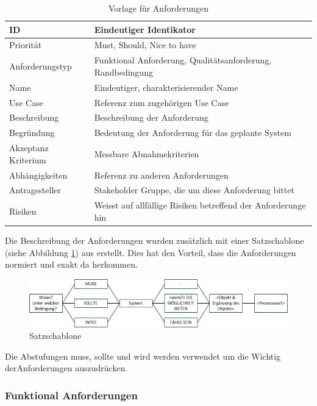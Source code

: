 \begin{table}[ht]
\centering
  \begin{tabular}{ l | p{8cm} }
	\hline
	\rowcolor{gray}
	ID 			&	Eindeutiger Identikator\\ \hline
	Priorität 		&	Must, Should, Nice to have\\ \hline
	Anforderungstyp	&	Funktional Anforderung, Qualitätsanforderung, Randbedingung\\ \hline
	Name 			&	Eindeutiger, charakterisierender Name\\ \hline
	Use Case 		&	Referenz zum zugehörigen Use Case\\ \hline
	Beschreibung 	&	Beschreibung der Anforderung\\ \hline
	Begründung 		&	Bedeutung der Anforderung für das geplante System\\ \hline
	Akzeptanz Kriterium	&	Messbare Abnahmekriterien\\ \hline
	Abhängigkeiten 	&	Referenz zu anderen Anforderungen\\ \hline
	Antragssteller 	&	Stakeholder Gruppe, die um diese Anforderung bittet\\ \hline
	Risiken	 	&	Weisst auf allfällige Risiken betreffend der Anforderunge hin
  \end{tabular}
   \caption{Vorlage für Anforderungen}\label{table:req_template}
\end{table}


Die Beschreibung der Anforderungen wurden zusätzlich mit einer Satzschablone (siehe Abbildung \ref{fig:satzschablone}) aus \cite{req_eng_book} erstellt. Dies hat den Vorteil, dass die Anforderungen normiert und exakt da herkommen.
\begin{figure}[h]
\includegraphics{images/anforderungen/satzschablone.png}
\caption{Satzschablone}
\label{fig:satzschablone}
\end{figure}
Die Abstufungen muss, sollte und wird werden verwendet um die Wichtig derAnforderungen auszudrücken.

\newpage
\FloatBarrier
\subsubsection{Funktional Anforderungen}\label{func_anforderungen}

